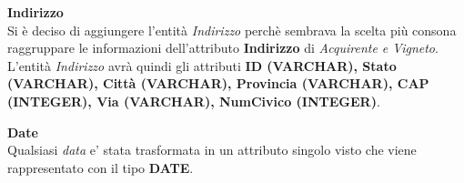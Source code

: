 \textbf{\large{Indirizzo}}\\
Si è deciso di aggiungere l'entità \emph{Indirizzo} perchè sembrava la scelta più consona raggruppare le informazioni dell'attributo \textbf{Indirizzo} di \emph{Acquirente e Vigneto}. L'entità \emph{Indirizzo} avrà quindi gli attributi \textbf{ID (VARCHAR), Stato (VARCHAR), Città (VARCHAR), Provincia (VARCHAR), CAP (INTEGER), Via (VARCHAR), NumCivico (INTEGER)}.

\begin{flushleft}
\textbf{\large{Date}}\\
Qualsiasi \emph{data} e' stata trasformata in un attributo singolo visto che viene rappresentato con il tipo \textbf{DATE}.
\end{flushleft}
